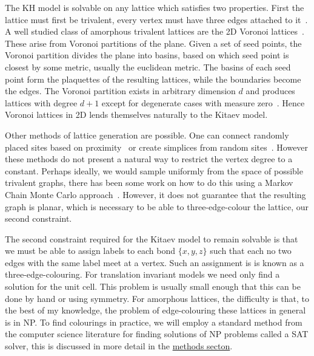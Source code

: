 The KH model is solvable on any lattice which satisfies two properties. First the lattice must first be trivalent, every vertex must have three edges attached to it~\autocite{kitaevAnyonsExactlySolved2006,Nussinov2009}. A well studied class of amorphous trivalent lattices are the 2D Voronoi lattices~\autocite{mitchellAmorphousTopologicalInsulators2018,florescu_designer_2009,marsalTopologicalWeaireThorpeModels2020}. These arise from Voronoi partitions of the plane. Given a set of seed points, the Voronoi partition divides the plane into basins, based on which seed point is closest by some metric, usually the euclidean metric. The basins of each seed point form the plaquettes of the resulting lattices, while the boundaries become the edges. The Voronoi partition exists in arbitrary dimension \(d\) and produces lattices with degree \(d+1\) except for degenerate cases with measure zero~\autocite{voronoiNouvellesApplicationsParamètres1908,watsonComputingNdimensionalDelaunay1981}. Hence Voronoi lattices in 2D lends themselves naturally to the Kitaev model.

Other methods of lattice generation are possible. One can connect randomly placed sites based on proximity~\autocite{agarwala2019topological} or create simplices from random sites~\autocite{christRandomLatticeField1982}. However these methods do not present a natural way to restrict the vertex degree to a constant. Perhaps ideally, we would sample uniformly from the space of possible trivalent graphs, there has been some work on how to do this using a Markov Chain Monte Carlo approach~\autocite{alyamiUniformSamplingDirected2016}. However, it does not guarantee that the resulting graph is planar, which is necessary to be able to three-edge-colour the lattice, our second constraint.

The second constraint required for the Kitaev model to remain solvable is that we must be able to assign labels to each bond \(\{x,y,z\}\) such that each no two edges with the same label meet at a vertex. Such an assignment is is known as a three-edge-colouring. For translation invariant models we need only find a solution for the unit cell. This problem is usually small enough that this can be done by hand or using symmetry. For amorphous lattices, the difficulty is that, to the best of my knowledge, the problem of edge-colouring these lattices in general is in NP. To find colourings in practice, we will employ a standard method from the computer science literature for finding solutions of NP problems called a SAT solver, this is discussed in more detail in the \protect\hyperlink{amk-methods}{methods secton}.

